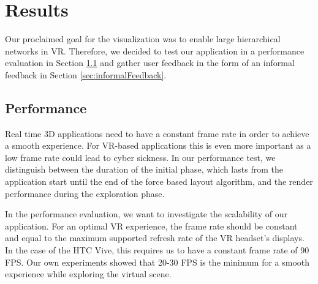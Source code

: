 \chapter{Results}

Our proclaimed goal for the visualization was to enable large hierarchical networks in VR. 
Therefore, we decided to test our application in a performance evaluation in Section \ref{sec:performanceEvaluation} and gather user feedback in the form of an informal feedback in Section \ref{sec:informalFeedback}.

\section{Performance}
\label{sec:performanceEvaluation}

Real time 3D applications need to have a constant frame rate in order to achieve a smooth experience.
For VR-based applications this is even more important as a low frame rate could lead to cyber sickness. 
In our performance test, we distinguish between the duration of the initial phase, which lasts from the application start until the end of the force based layout algorithm, and the render performance during the exploration phase. 

In the performance evaluation, we want to investigate the scalability of our application. 
For an optimal VR experience, the frame rate should be constant and equal to the maximum supported refresh rate of the VR headset's displays. In the case of the HTC Vive, this requires us to have a constant frame rate of 90 FPS.
Our own experiments showed that 20-30 FPS is the minimum for a smooth experience while exploring the virtual scene.

